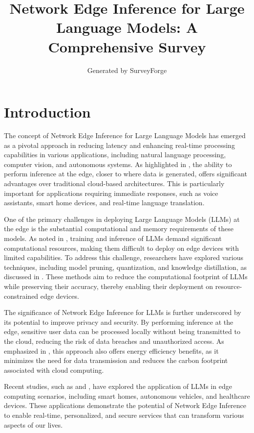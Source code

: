 \documentclass[11pt,a4paper]{article}
\title{Network Edge Inference for Large Language Models: A Comprehensive Survey}
\author{Generated by SurveyForge}
\date{}
\begin{document}
\maketitle
\tableofcontents
\newpage



\section{Introduction}


The concept of Network Edge Inference for Large Language Models has emerged as a pivotal approach in reducing latency and enhancing real-time processing capabilities in various applications, including natural language processing, computer vision, and autonomous systems. As highlighted in \cite{arxiv:2402.06196}, the ability to perform inference at the edge, closer to where data is generated, offers significant advantages over traditional cloud-based architectures. This is particularly important for applications requiring immediate responses, such as voice assistants, smart home devices, and real-time language translation.

One of the primary challenges in deploying Large Language Models (LLMs) at the edge is the substantial computational and memory requirements of these models. As noted in \cite{doi:10.1145/3458817.3476209}, training and inference of LLMs demand significant computational resources, making them difficult to deploy on edge devices with limited capabilities. To address this challenge, researchers have explored various techniques, including model pruning, quantization, and knowledge distillation, as discussed in \cite{doi:10.1609/aaai.v37i9.26255}. These methods aim to reduce the computational footprint of LLMs while preserving their accuracy, thereby enabling their deployment on resource-constrained edge devices.

The significance of Network Edge Inference for LLMs is further underscored by its potential to improve privacy and security. By performing inference at the edge, sensitive user data can be processed locally without being transmitted to the cloud, reducing the risk of data breaches and unauthorized access. As emphasized in \cite{doi:10.1109/hpec58863.2023.10363447}, this approach also offers energy efficiency benefits, as it minimizes the need for data transmission and reduces the carbon footprint associated with cloud computing.

Recent studies, such as \cite{doi:10.1109/comst.2025.3527641} and \cite{doi:10.1109/mnet.2025.3539338}, have explored the application of LLMs in edge computing scenarios, including smart homes, autonomous vehicles, and healthcare devices. These applications demonstrate the potential of Network Edge Inference to enable real-time, personalized, and secure services that can transform various aspects of our lives.
\end{document}
